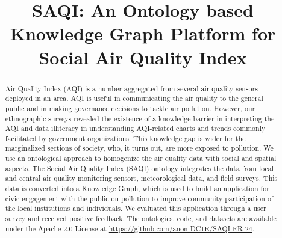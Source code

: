\documentclass[runningheads]{llncs}
\begin{document}
%
\title{SAQI: An Ontology based Knowledge Graph Platform for Social Air Quality Index}
%
%
%
%
\maketitle              %
%
\begin{abstract}
Air Quality Index (AQI) is a number aggregated from several air quality sensors deployed in an area. AQI is useful in communicating the air quality to the general public and in making governance decisions to tackle air pollution. However, our ethnographic surveys revealed the existence of a knowledge barrier in interpreting the AQI and data illiteracy in understanding AQI-related charts and trends commonly facilitated by government organizations. This knowledge gap is wider for the marginalized sections of society, who, it turns out, are more exposed to pollution. We use an ontological approach to homogenize the air quality data with social and spatial aspects. The Social Air Quality Index (SAQI) ontology integrates the data from local and central air quality monitoring sensors, meteorological data, and field surveys. This data is converted into a Knowledge Graph, which is used to build an application for civic engagement with the public on pollution to improve community participation of the local institutions and individuals. We evaluated this application through a user survey and received positive feedback. The ontologies, code, and datasets are available under the Apache 2.0 License at \url{https://github.com/anon-DC1E/SAQI-ER-24}. 

 \\


%
\end{abstract}

%
%
%














\end{document}
